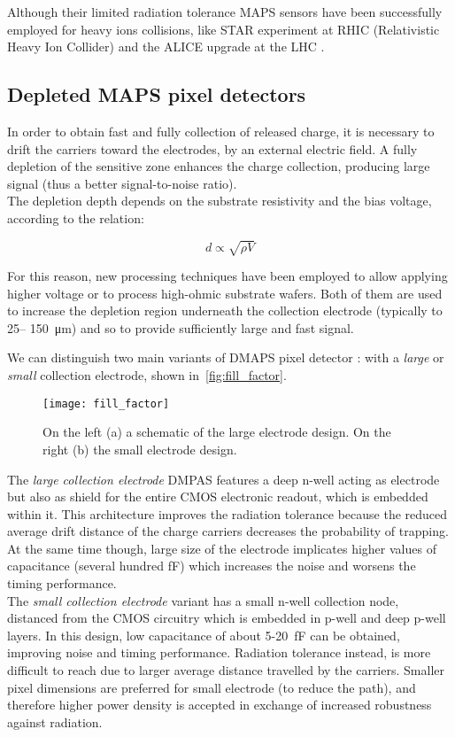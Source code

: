 Although their limited radiation tolerance MAPS sensors have been successfully employed for heavy ions collisions, like STAR experiment at RHIC (Relativistic Heavy Ion Collider) \cite{Greiner:2013tva} and the ALICE upgrade at the LHC \cite{ALICE:2013nwm}.


\subsection{Depleted MAPS pixel detectors}

In order to obtain fast and fully collection of released charge, it is necessary to drift the carriers toward the electrodes, by an external electric field. A fully depletion of the sensitive zone enhances the charge collection, producing large signal (thus a better signal-to-noise ratio). \\
The depletion depth depends on the substrate resistivity and the bias voltage, according to the relation:

\begin{equation}
d \propto \sqrt{\rho V}
\end{equation}

For this reason, new processing techniques have been employed to allow applying higher voltage or to process high-ohmic substrate wafers. Both of them are used to increase the depletion region underneath the collection electrode (typically to 25– \SI{150}{\micro m}) and so to provide sufficiently large and fast signal.

We can distinguish two main variants of DMAPS pixel detector \cite{Garcia-Sciveres:2017ymt}: with a \textit{large} or \textit{small} collection electrode, shown in~\autoref{fig:fill_factor}.

\begin{figure}[h!]
\centering
\texttt{[image: fill\_factor]}
\caption{On the left (a) a schematic of the large electrode design. On the right (b) the small electrode design.}
\label{fig:fill_factor}
\end{figure}

The \textit{large collection electrode} DMPAS features a deep n-well acting as electrode but also as shield for the entire CMOS electronic readout, which is embedded within it. This architecture improves the radiation tolerance because the reduced average drift distance of the charge carriers decreases the probability of trapping. At the same time though, large size of the electrode implicates higher values of capacitance (several hundred fF) which increases the noise and worsens the timing performance.\\
The \textit{small collection electrode} variant has a small n-well collection node, distanced from the CMOS circuitry which is embedded in p-well and deep p-well layers. In this design, low capacitance of about 5-\SI{20}{fF} can be obtained, improving noise and timing performance.
Radiation tolerance instead, is more difficult to reach due to larger average distance travelled by the carriers. Smaller pixel dimensions are preferred for small electrode (to reduce the path), and therefore higher power density is accepted in exchange of increased robustness against radiation.\\


